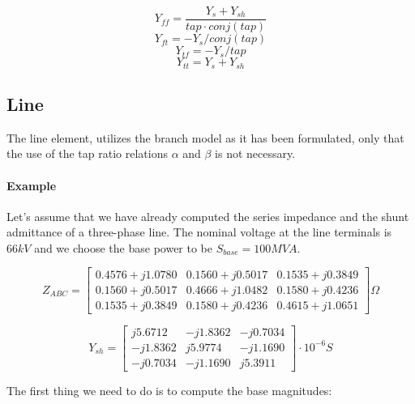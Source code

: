 \documentclass[nols,a4paper,twoside,symmetric,notoc,fleqn]{tufte-book}
\begin{document}

$$Y_{ff} = \frac{Y_s + Y_{sh}}{tap \cdot conj(tap)}  $$
$$Y_{ft} = - Y_s / conj(tap)$$
$$Y_{tf} = - Y_s / tap$$
$$Y_{tt} = Y_s + Y_{sh}$$



\subsection{Line}

The line element, utilizes the branch model as it has been formulated, only that the use of the tap ratio relations $\alpha$ and $\beta$ is not necessary.






\paragraph{Example}

Let's assume that we have already computed the series impedance and the shunt admittance of a three-phase line. The nominal voltage at the line terminals is $66kV$ and we choose the base power to be $S_{base}=100MVA$.

$$
Z_{ABC} = \left[ \begin{array}{ccc}
0.4576 + j 1.0780 & 0.1560 + j0 .5017 & 0.1535 + j 0.3849 \\
0.1560 + j 0.5017 & 0.4666 + j 1.0482 & 0.1580 + j 0.4236 \\ 
0.1535 + j 0.3849 & 0.1580 + j 0.4236 & 0.4615 + j 1.0651
\end{array} \right] \Omega
$$

$$
Y_{sh} = \left[ \begin{array}{ccc}
j5.6712 & -j1.8362 & -j0.7034 \\
-j1.8362 & j5.9774 & -j1.1690 \\ 
-j0.7034 & -j1.1690 & j5.3911
\end{array} \right] \cdot 10^{-6}  S
$$

The first thing we need to do is to compute the base magnitudes:
\end{document}
